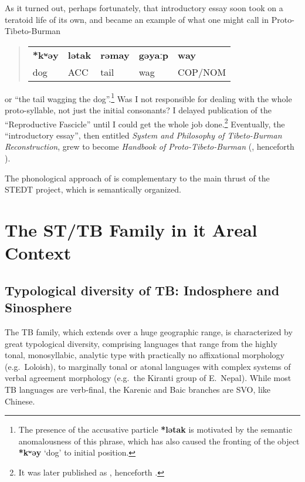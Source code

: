 As it turned out, perhaps fortunately, that introductory essay soon took on a teratoid life of its own, and became an example of what one might call in Proto-Tibeto-Burman 
\begin{quote}
\begin{center}
\begin{tabular}{l l l l l}
\textbf{*kʷəy} & \textbf{lətak} & \textbf{rəmay} & \textbf{gəyaːp} & \textbf{way}\\
dog & ACC & tail & wag & COP/NOM
\end{tabular}
\end{center}
\end{quote}
or “the tail wagging the dog”.\footnote{The presence of the accusative particle \textbf{*lətak} is motivated by the semantic anomalousness of this phrase, which has also caused the fronting of the object \textbf{*kʷəy} ‘dog’ to initial position.} Was I not responsible for dealing with the whole proto-syllable, not just the initial consonants? I delayed publication of the “Reproductive Fascicle” until I could get the whole job done.\footnote{It was later published as \citealt{JAM-TBRS}, henceforth \textit{}.}
Eventually, the “introductory essay”, then entitled \textit{System and Philosophy of Tibeto-Burman Reconstruction}, grew to become \textit{Handbook of Proto-Tibeto-Burman} (\citealt{JAM-HPTB}, henceforth \textit{}).


The phonological approach of \textit{} is complementary to the main thrust of the STEDT project, which is semantically organized.

\section{The ST/TB Family in it Areal Context}

\subsection{Typological diversity of TB: Indosphere and Sinosphere}

The TB family, which extends over a huge geographic range, is characterized by great typological diversity, comprising languages that range from the highly tonal, monosyllabic, analytic type with practically no affixational morphology (e.g.\ Loloish), to marginally tonal or atonal languages with complex systems of verbal agreement morphology (e.g.\ the Kiranti group of E.\ Nepal). While most TB languages are verb-final, the Karenic and Baic branches are SVO, like Chinese.
 
